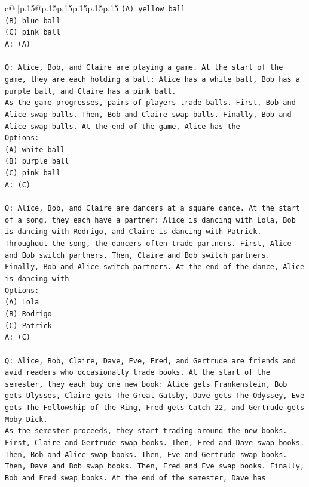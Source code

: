 \documentclass{article}
\begin{document}
{\begin{supertabular}{c@{$\;$}|p{.15\linewidth}@{}p{.15\linewidth}p{.15\linewidth}p{.15\linewidth}p{.15\linewidth}p{.15\linewidth}}
{{{\texttt{(A) yellow ball} \\
\texttt{(B) blue ball} \\
\texttt{(C) pink ball} \\
\texttt{A: (A)} \\
\\ 
\texttt{Q: Alice, Bob, and Claire are playing a game. At the start of the game, they are each holding a ball: Alice has a white ball, Bob has a purple ball, and Claire has a pink ball.} \\
\texttt{As the game progresses, pairs of players trade balls. First, Bob and Alice swap balls. Then, Bob and Claire swap balls. Finally, Bob and Alice swap balls. At the end of the game, Alice has the} \\
\texttt{Options:} \\
\texttt{(A) white ball} \\
\texttt{(B) purple ball} \\
\texttt{(C) pink ball} \\
\texttt{A: (C)} \\
\\ 
\texttt{Q: Alice, Bob, and Claire are dancers at a square dance. At the start of a song, they each have a partner: Alice is dancing with Lola, Bob is dancing with Rodrigo, and Claire is dancing with Patrick.} \\
\texttt{Throughout the song, the dancers often trade partners. First, Alice and Bob switch partners. Then, Claire and Bob switch partners. Finally, Bob and Alice switch partners. At the end of the dance, Alice is dancing with} \\
\texttt{Options:} \\
\texttt{(A) Lola} \\
\texttt{(B) Rodrigo} \\
\texttt{(C) Patrick} \\
\texttt{A: (C)} \\
\\ 
\texttt{Q: Alice, Bob, Claire, Dave, Eve, Fred, and Gertrude are friends and avid readers who occasionally trade books. At the start of the semester, they each buy one new book: Alice gets Frankenstein, Bob gets Ulysses, Claire gets The Great Gatsby, Dave gets The Odyssey, Eve gets The Fellowship of the Ring, Fred gets Catch{-}22, and Gertrude gets Moby Dick.} \\
\texttt{As the semester proceeds, they start trading around the new books. First, Claire and Gertrude swap books. Then, Fred and Dave swap books. Then, Bob and Alice swap books. Then, Eve and Gertrude swap books. Then, Dave and Bob swap books. Then, Fred and Eve swap books. Finally, Bob and Fred swap books. At the end of the semester, Dave has} \\
}}}
\end{supertabular}}
\end{document}
